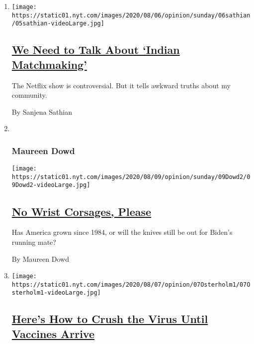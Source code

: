 \begin{enumerate}
\def\labelenumi{\arabic{enumi}.}
\item
  \texttt{[image: https://static01.nyt.com/images/2020/08/06/opinion/sunday/06sathian/05sathian-videoLarge.jpg]}

  \hypertarget{we-need-to-talk-about-indian-matchmaking}{%
  \subsection{\texorpdfstring{\href{/2020/08/05/opinion/sunday/indian-matchmaking-netflix.html}{We
  Need to Talk About `Indian
  Matchmaking'}}{We Need to Talk About `Indian Matchmaking'}}\label{we-need-to-talk-about-indian-matchmaking}}

  The Netflix show is controversial. But it tells awkward truths about
  my community.

  By Sanjena Sathian
\item ~
  \hypertarget{maureen-dowd}{%
  \subsubsection{Maureen Dowd}\label{maureen-dowd}}

  \texttt{[image: https://static01.nyt.com/images/2020/08/09/opinion/sunday/09Dowd2/09Dowd2-videoLarge.jpg]}

  \hypertarget{no-wrist-corsages-please}{%
  \subsection{\texorpdfstring{\href{/2020/08/08/opinion/sunday/biden-vice-president-geraldine-ferraro.html}{No
  Wrist Corsages,
  Please}}{No Wrist Corsages, Please}}\label{no-wrist-corsages-please}}

  Has America grown since 1984, or will the knives still be out for
  Biden's running mate?

  By Maureen Dowd
\item
  \texttt{[image: https://static01.nyt.com/images/2020/08/07/opinion/07Osterholm1/07Osterholm1-videoLarge.jpg]}

  \hypertarget{heres-how-to-crush-the-virus-until-vaccines-arrive}{%
  \subsection{\texorpdfstring{\href{/2020/08/07/opinion/coronavirus-lockdown-unemployment-death.html}{Here's
  How to Crush the Virus Until Vaccines
  Arrive}}{Here's How to Crush the Virus Until Vaccines Arrive}}\label{heres-how-to-crush-the-virus-until-vaccines-arrive}}


\end{enumerate}
